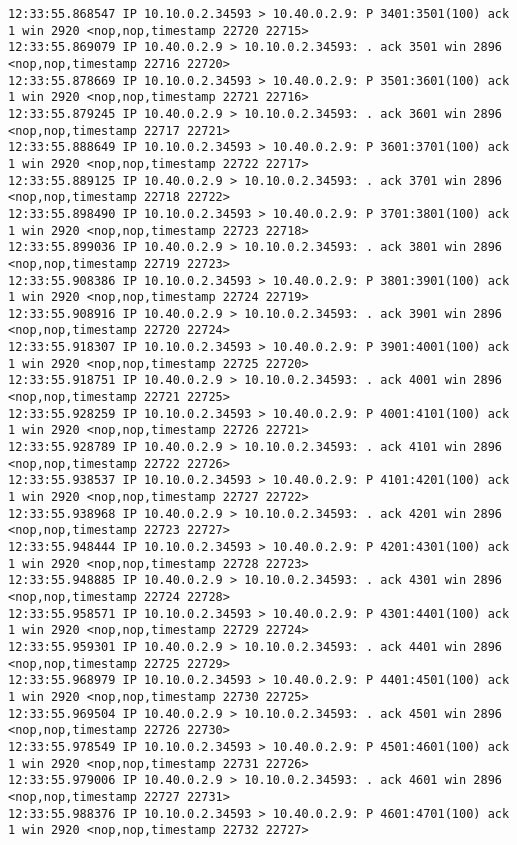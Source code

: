 \documentclass[a4paper,12pt]{article}
\begin{document}
\begin{lstlisting}
12:33:55.868547 IP 10.10.0.2.34593 > 10.40.0.2.9: P 3401:3501(100) ack 1 win 2920 <nop,nop,timestamp 22720 22715>
12:33:55.869079 IP 10.40.0.2.9 > 10.10.0.2.34593: . ack 3501 win 2896 <nop,nop,timestamp 22716 22720>
12:33:55.878669 IP 10.10.0.2.34593 > 10.40.0.2.9: P 3501:3601(100) ack 1 win 2920 <nop,nop,timestamp 22721 22716>
12:33:55.879245 IP 10.40.0.2.9 > 10.10.0.2.34593: . ack 3601 win 2896 <nop,nop,timestamp 22717 22721>
12:33:55.888649 IP 10.10.0.2.34593 > 10.40.0.2.9: P 3601:3701(100) ack 1 win 2920 <nop,nop,timestamp 22722 22717>
12:33:55.889125 IP 10.40.0.2.9 > 10.10.0.2.34593: . ack 3701 win 2896 <nop,nop,timestamp 22718 22722>
12:33:55.898490 IP 10.10.0.2.34593 > 10.40.0.2.9: P 3701:3801(100) ack 1 win 2920 <nop,nop,timestamp 22723 22718>
12:33:55.899036 IP 10.40.0.2.9 > 10.10.0.2.34593: . ack 3801 win 2896 <nop,nop,timestamp 22719 22723>
12:33:55.908386 IP 10.10.0.2.34593 > 10.40.0.2.9: P 3801:3901(100) ack 1 win 2920 <nop,nop,timestamp 22724 22719>
12:33:55.908916 IP 10.40.0.2.9 > 10.10.0.2.34593: . ack 3901 win 2896 <nop,nop,timestamp 22720 22724>
12:33:55.918307 IP 10.10.0.2.34593 > 10.40.0.2.9: P 3901:4001(100) ack 1 win 2920 <nop,nop,timestamp 22725 22720>
12:33:55.918751 IP 10.40.0.2.9 > 10.10.0.2.34593: . ack 4001 win 2896 <nop,nop,timestamp 22721 22725>
12:33:55.928259 IP 10.10.0.2.34593 > 10.40.0.2.9: P 4001:4101(100) ack 1 win 2920 <nop,nop,timestamp 22726 22721>
12:33:55.928789 IP 10.40.0.2.9 > 10.10.0.2.34593: . ack 4101 win 2896 <nop,nop,timestamp 22722 22726>
12:33:55.938537 IP 10.10.0.2.34593 > 10.40.0.2.9: P 4101:4201(100) ack 1 win 2920 <nop,nop,timestamp 22727 22722>
12:33:55.938968 IP 10.40.0.2.9 > 10.10.0.2.34593: . ack 4201 win 2896 <nop,nop,timestamp 22723 22727>
12:33:55.948444 IP 10.10.0.2.34593 > 10.40.0.2.9: P 4201:4301(100) ack 1 win 2920 <nop,nop,timestamp 22728 22723>
12:33:55.948885 IP 10.40.0.2.9 > 10.10.0.2.34593: . ack 4301 win 2896 <nop,nop,timestamp 22724 22728>
12:33:55.958571 IP 10.10.0.2.34593 > 10.40.0.2.9: P 4301:4401(100) ack 1 win 2920 <nop,nop,timestamp 22729 22724>
12:33:55.959301 IP 10.40.0.2.9 > 10.10.0.2.34593: . ack 4401 win 2896 <nop,nop,timestamp 22725 22729>
12:33:55.968979 IP 10.10.0.2.34593 > 10.40.0.2.9: P 4401:4501(100) ack 1 win 2920 <nop,nop,timestamp 22730 22725>
12:33:55.969504 IP 10.40.0.2.9 > 10.10.0.2.34593: . ack 4501 win 2896 <nop,nop,timestamp 22726 22730>
12:33:55.978549 IP 10.10.0.2.34593 > 10.40.0.2.9: P 4501:4601(100) ack 1 win 2920 <nop,nop,timestamp 22731 22726>
12:33:55.979006 IP 10.40.0.2.9 > 10.10.0.2.34593: . ack 4601 win 2896 <nop,nop,timestamp 22727 22731>
12:33:55.988376 IP 10.10.0.2.34593 > 10.40.0.2.9: P 4601:4701(100) ack 1 win 2920 <nop,nop,timestamp 22732 22727>

\end{lstlisting}
\end{document}
